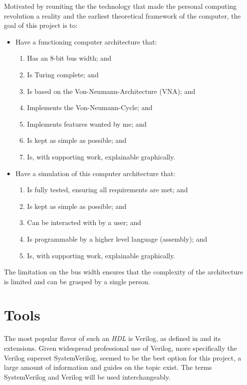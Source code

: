Motivated by reuniting the the technology that made the personal computing revolution a reality and the earliest theoretical framework of the computer, the goal of this project is to: 
\begin{itemize}
  \item Have a functioning computer architecture that:
 \begin{enumerate}
    \item Has an 8-bit bus width; and
    \item Is Turing complete; and
    \item Is based on the Von-Neumann-Architecture (VNA); and
    \item Implements the Von-Neumann-Cycle; and
    \item Implements features wanted by me; and  
    \item Is kept as simple as possible; and
    \item Is, with supporting work, explainable graphically.
  \end{enumerate}
  \item Have a simulation of this computer architecture that: 
  \begin{enumerate}
    \item Is fully tested, ensuring all requirements are met; and
    \item Is kept as simple as possible; and
    \item Can be interacted with by a user; and
    \item Is programmable by a higher level language (assembly); and
    \item Is, with supporting work, explainable graphically.
  \end{enumerate}
  
\end{itemize}

The limitation on the bus width ensures that the complexity of the architecture is limited and can be grasped by a single person.

\section{Tools}

The most popular flavor of such an \textit{HDL} is Verilog, as defined in \cite{10458102} and its extensions. Given widespread professional use of Verilog, more specifically the Verilog superset SystemVerilog, seemed to be the best option for this project, a large amount of information and guides on the topic exist. The terms SystemVerilog and Verilog will be used interchangeably. 

